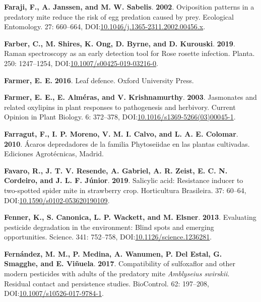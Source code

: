 \documentclass[12pt,final,CPage]{ufthesis}
\newlength{\cslhangindent}
\newenvironment{CSLReferences}[2] %
{%
	\setlength{\parindent}{0pt}
	\ifodd #1 \everypar{\setlength{\hangindent}{\cslhangindent}}\ignorespaces\fi
	\ifnum #2 > 0
	\setlength{\parskip}{#2\baselineskip}
	\fi
}%
{}
\begin{document}
{\begin{CSLReferences}{1}{0}
  \leavevmode{}%
  \textbf{Faraji, F., A. Janssen, and M. W. Sabelis}. \textbf{2002}. Oviposition patterns in a predatory mite reduce the risk of egg predation caused by prey. Ecological Entomology. 27: 660--664, DOI:\href{https://doi.org/10.1046/j.1365-2311.2002.00456.x}{10.1046/j.1365-2311.2002.00456.x}.

  \leavevmode{}%
  \textbf{Farber, C., M. Shires, K. Ong, D. Byrne, and D. Kurouski}. \textbf{2019}. {Raman} spectroscopy as an early detection tool for {Rose rosette} infection. Planta. 250: 1247--1254, DOI:\href{https://doi.org/10.1007/s00425-019-03216-0}{10.1007/s00425-019-03216-0}.

  \leavevmode{}%
  \textbf{Farmer, E. E.} \textbf{2016}. Leaf defence. Oxford University Press.

  \leavevmode{}%
  \textbf{Farmer, E. E., E. Alméras, and V. Krishnamurthy}. \textbf{2003}. Jasmonates and related oxylipins in plant responses to pathogenesis and herbivory. Current Opinion in Plant Biology. 6: 372--378, DOI:\href{https://doi.org/10.1016/s1369-5266(03)00045-1}{10.1016/s1369-5266(03)00045-1}.

  \leavevmode{}%
  \textbf{Farragut, F., I. P. Moreno, V. M. I. Calvo, and L. A. E. Colomar}. \textbf{2010}. {Á}caros depredadores de la familia {Phytoseiidae} en las plantas cultivadas. Ediciones Agrot{é}cnicas, Madrid.

  \leavevmode{}%
  \textbf{Favaro, R., J. T. V. Resende, A. Gabriel, A. R. Zeist, E. C. N. Cordeiro, and J. L. F. Júnior}. \textbf{2019}. Salicylic acid: Resistance inducer to two-spotted spider mite in strawberry crop. Horticultura Brasileira. 37: 60--64, DOI:\href{https://doi.org/10.1590/s0102-053620190109}{10.1590/s0102-053620190109}.

  \leavevmode{}%
  \textbf{Fenner, K., S. Canonica, L. P. Wackett, and M. Elsner}. \textbf{2013}. Evaluating pesticide degradation in the environment: Blind spots and emerging opportunities. Science. 341: 752--758, DOI:\href{https://doi.org/10.1126/science.1236281}{10.1126/science.1236281}.

  \leavevmode{}%
  \textbf{Fernández, M. M., P. Medina, A. Wanumen, P. Del Estal, G. Smagghe, and E. Viñuela}. \textbf{2017}. Compatibility of sulfoxaflor and other modern pesticides with adults of the predatory mite {\emph{Amblyseius swirskii}}. Residual contact and persistence studies. {BioControl}. 62: 197--208, DOI:\href{https://doi.org/10.1007/s10526-017-9784-1}{10.1007/s10526-017-9784-1}.


\end{CSLReferences}}
\end{document}
